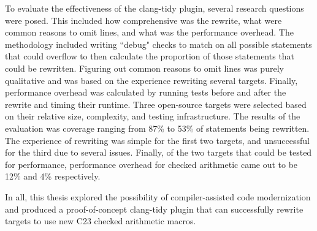 To evaluate the effectiveness of the clang-tidy plugin, several research questions were posed. This included how comprehensive was the rewrite, what were common reasons to omit lines, and what was the performance overhead. The methodology included writing ``debug" checks to match on all possible statements that could overflow to then calculate the proportion of those statements that could be rewritten. Figuring out common reasons to omit lines was purely qualitative and was based on the experience rewriting several targets. Finally, performance overhead was calculated by running tests before and after the rewrite and timing their runtime. Three open-source targets were selected based on their relative size, complexity, and testing infrastructure. The results of the evaluation was coverage ranging from 87\% to 53\% of statements being rewritten. The experience of rewriting was simple for the first two targets, and unsuccessful for the third due to several issues. Finally, of the two targets that could be tested for performance, performance overhead for checked arithmetic came out to be 12\% and 4\% respectively.

In all, this thesis explored the possibility of compiler-assisted code modernization and produced a proof-of-concept clang-tidy plugin that can successfully rewrite targets to use new C23 checked arithmetic macros.